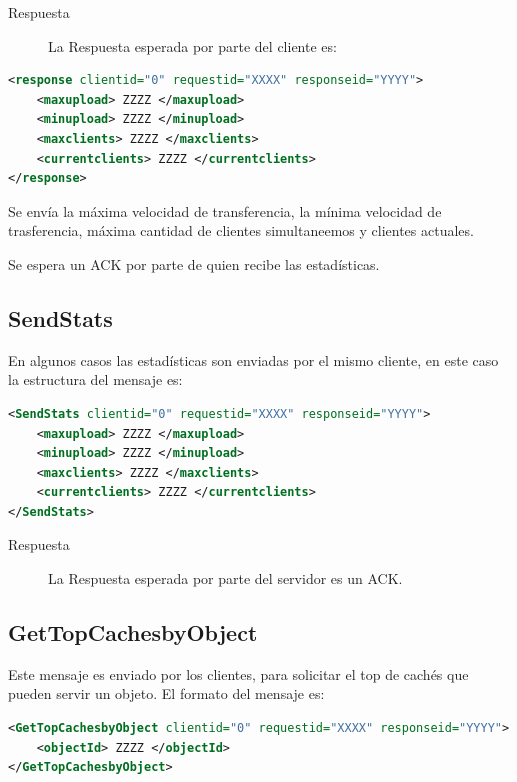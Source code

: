 \begin{description}
\item[Respuesta] La Respuesta esperada por parte del cliente es:
\end{description}

\begin{lstlisting}[language=XML,caption=Mensaje de Respuesta de GetStats]
<response clientid="0" requestid="XXXX" responseid="YYYY"> 
	<maxupload> ZZZZ </maxupload>
	<minupload> ZZZZ </minupload>
	<maxclients> ZZZZ </maxclients>
	<currentclients> ZZZZ </currentclients>
</response>
\end{lstlisting}

Se envía la máxima velocidad de transferencia, la mínima velocidad de trasferencia, máxima cantidad de clientes simultaneemos y clientes actuales.

Se espera un ACK por parte de quien recibe las estadísticas.

\subsection{SendStats}

En algunos casos las estadísticas son enviadas por el mismo cliente, en este caso la estructura del mensaje es:

\begin{lstlisting}[language=XML,caption=Mensaje de SendStats]
<SendStats clientid="0" requestid="XXXX" responseid="YYYY"> 
	<maxupload> ZZZZ </maxupload>
	<minupload> ZZZZ </minupload>
	<maxclients> ZZZZ </maxclients>
	<currentclients> ZZZZ </currentclients>
</SendStats>
\end{lstlisting}

\begin{description}
\item[Respuesta] La Respuesta esperada por parte del servidor es un ACK.
\end{description}

\subsection{GetTopCachesbyObject}

Este mensaje es enviado por los clientes, para solicitar el top de cachés que pueden servir un objeto. El formato del mensaje es:

\begin{lstlisting}[language=XML,caption=Mensaje de GetTopCachesbyObject]
<GetTopCachesbyObject clientid="0" requestid="XXXX" responseid="YYYY"> 
	<objectId> ZZZZ </objectId>
</GetTopCachesbyObject>
\end{lstlisting}


